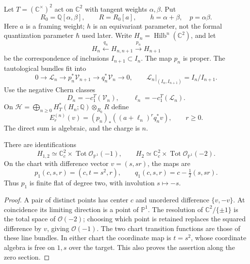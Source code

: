Let \(T=(\mathbb C^\times)^2\) act on \(\mathbb C^2\) with tangent
weights \(\alpha,\beta\). Put
\[
 R_0=\mathbb Q[\alpha,\beta],\qquad R=R_0[a],\qquad
 h=\alpha+\beta,\quad p=\alpha\beta.
\]
Here \(a\) is a framing weight; \(h\) is an equivariant parameter,
not the formal quantization parameter \(\hbar\) used later.
Write \(H_n=\operatorname{Hilb}^n(\mathbb C^2)\), and let
\[
 H_n\xleftarrow{q_n}H_{n,n+1}\xrightarrow{p_n}H_{n+1}
\]
be the correspondence of inclusions \(I_{n+1}\subset I_n\).
The map \(p_n\) is proper. The tautological bundles fit into
\[
 0\longrightarrow\mathcal L_n\longrightarrow
 p_n^*\mathcal V_{n+1}\longrightarrow q_n^*\mathcal V_n
 \longrightarrow0,\qquad
 \mathcal L_n|_{(I_n,I_{n+1})}=I_n/I_{n+1}.
\]
Use the negative Chern classes
\[
 D_n=-c_1^T(\mathcal V_n),\qquad
 \ell_n=-c_1^T(\mathcal L_n).
\]
On \(\mathcal H=\bigoplus_{n\geq0}H_T^*(H_n;\mathbb Q)\otimes_{R_0}R\)
define
\begin{equation}\label{cyrep:eq:hecke}
 E_r^{(n)}(v)=(p_n)_*((a+\ell_n)^r q_n^*v),\qquad r\geq0.
\end{equation}
The direct sum is algebraic, and the charge is \(n\).

\begin{proposition}\label{cyrep:prop:double-cover}
There are identifications
\[
 H_{1,2}\simeq\mathbb C_c^2\times
       \operatorname{Tot}\mathcal O_{\mathbb P^1}(-1),\qquad
 H_2\simeq\mathbb C_c^2\times
       \operatorname{Tot}\mathcal O_{\mathbb P^1}(-2).
\]
On the chart with difference vector \(v=(s,sr)\), the maps are
\[
 p_1(c,s,r)=(c,t=s^2,r),\qquad
 q_1(c,s,r)=c-\tfrac12(s,sr).
\]
Thus \(p_1\) is finite flat of degree two, with involution
\(s\mapsto-s\).
\end{proposition}

\begin{proof}
A pair of distinct points has center \(c\) and unordered difference
\(\{v,-v\}\). At coincidence its limiting direction is a point of
\(\mathbb P^1\). The resolution of \(\mathbb C^2/\{\pm1\}\) is the
total space of \(\mathcal O(-2)\); choosing which point is retained
replaces the squared difference by \(v\), giving \(\mathcal O(-1)\).
The two chart transition functions are those of these line bundles.
In either chart the coordinate map is \(t=s^2\), whose coordinate
algebra is free on \(1,s\) over the target. This also proves the
assertion along the zero section.
\end{proof}

